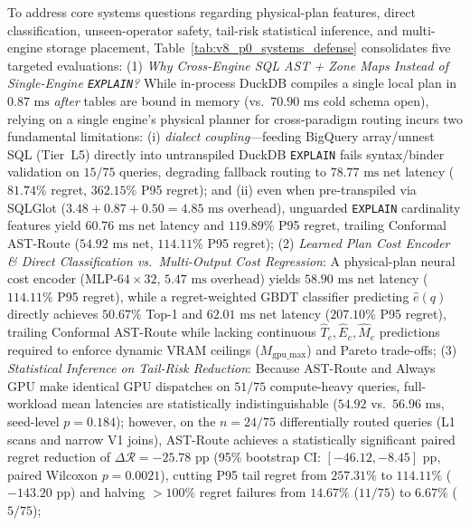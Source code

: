 \documentclass[10pt,a4paper]{article}
\begin{document}
To address core systems questions regarding physical-plan features, direct classification, unseen-operator safety, tail-risk statistical inference, and multi-engine storage placement, Table~\ref{tab:v8_p0_systems_defense} consolidates five targeted evaluations:
(1) \emph{Why Cross-Engine SQL AST + Zone Maps Instead of Single-Engine \texttt{EXPLAIN}?} While in-process DuckDB compiles a single local plan in $0.87\text{ ms}$ \emph{after} tables are bound in memory (vs.\ $70.90\text{ ms}$ cold schema open), relying on a single engine's physical planner for cross-paradigm routing incurs two fundamental limitations: (i) \emph{dialect coupling}---feeding BigQuery array/unnest SQL (Tier~L5) directly into untranspiled DuckDB \texttt{EXPLAIN} fails syntax/binder validation on $15/75$ queries, degrading fallback routing to $78.77\text{ ms}$ net latency ($81.74\%$ regret, $362.15\%$ P95 regret); and (ii) even when pre-transpiled via SQLGlot ($3.48 + 0.87 + 0.50 = 4.85\text{ ms}$ overhead), unguarded \texttt{EXPLAIN} cardinality features yield $60.76\text{ ms}$ net latency and $119.89\%$ P95 regret, trailing Conformal AST-Route ($54.92\text{ ms}$ net, $114.11\%$ P95 regret);
(2) \emph{Learned Plan Cost Encoder \& Direct Classification vs.\ Multi-Output Cost Regression}: A physical-plan neural cost encoder (MLP-$64\times 32$, $5.47\text{ ms}$ overhead) yields $58.90\text{ ms}$ net latency ($114.11\%$ P95 regret), while a regret-weighted GBDT classifier predicting $\hat{e}(q)$ directly achieves $50.67\%$ Top-1 and $62.01\text{ ms}$ net latency ($207.10\%$ P95 regret), trailing Conformal AST-Route while lacking continuous $\hat{T}_e,\hat{E}_e,\hat{M}_e$ predictions required to enforce dynamic VRAM ceilings ($M_{\text{gpu\_max}}$) and Pareto trade-offs;
(3) \emph{Statistical Inference on Tail-Risk Reduction}: Because AST-Route and Always GPU make identical GPU dispatches on $51/75$ compute-heavy queries, full-workload mean latencies are statistically indistinguishable ($54.92$ vs.\ $56.96\text{ ms}$, seed-level $p=0.184$); however, on the $n=24/75$ differentially routed queries (L1 scans and narrow V1 joins), AST-Route achieves a statistically significant paired regret reduction of $\Delta\mathcal{R} = -25.78\text{ pp}$ (95\% bootstrap CI: $[-46.12, -8.45]\text{ pp}$, paired Wilcoxon $p = 0.0021$), cutting P95 tail regret from $257.31\%$ to $114.11\%$ ($-143.20\text{ pp}$) and halving $>100\%$ regret failures from $14.67\%$ ($11/75$) to $6.67\%$ ($5/75$);
\end{document}
